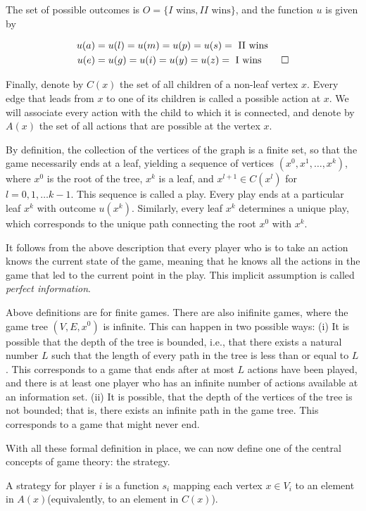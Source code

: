 The set of possible outcomes is $O = \{I \text{ wins}, II \text{ wins} \}$, and the function $u$ is given by

\begin{align*}
u(a) &= u(l) = u(m) = u(p) = u(s) = \text{ II wins} \\
u(e) &= u(g) = u(i) = u(y) = u(z) = \text{ I wins} \qed
\end{align*}

Finally, denote by $C(x)$ the set of all children of a non-leaf vertex $x$. Every edge that leads from $x$ to one of its children is called a possible action at $x$. We will associate every action with the child to which it is connected, and denote by $A(x)$ the set of all actions that are possible at the vertex $x$.

By definition, the collection of the vertices of the graph is a finite set, so that the game necessarily ends at a leaf, yielding a sequence of vertices $(x^0, x^1, \ldots , x^k)$, where $x^0$ is the root of the tree, $x^k$ is a leaf, and $x^{l+1} \in C(x^l)$ for $l = 0, 1, \ldots k-1$. This sequence is called a play. Every play ends at a particular leaf $x^k$ with outcome $u(x^k)$. Similarly, every leaf $x^k$ determines a unique play, which corresponds to the unique path connecting the root $x^0$ with $x^k$.

It follows from the above description that every player who is to take an action knows the current state of the game, meaning that he knows all the actions in the game that led to the current point in the play. This implicit assumption is called \emph{perfect information}.

Above definitions are for finite games. There are also inifinite games, where the game tree $(V, E, x^0)$ is infinite. This can happen in two possible ways: (i) It is possible that the depth of the tree is bounded, i.e., that there exists a natural number $L$ such that the length of every path in the tree is less than or equal to $L$. This corresponds to a game that ends after at most $L$ actions have been played, and there is at least one player who has an infinite number of actions available at an information set. (ii) It is possible, that the depth of the vertices of the tree is not bounded; that is, there exists an infinite path in the game tree. This corresponds to a game that might never end.


With all these formal definition in place, we can now define one of the central concepts of game theory: the strategy.

\begin{definition}
A strategy for player $i$ is a function $s_i$ mapping each vertex $x \in V_i$ to an element in $A(x)$(equivalently, to an element in $C(x)$).
\end{definition}


